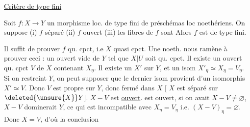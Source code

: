 \uline{Critère de type fini}

 \quad Soit $f:X\longrightarrow Y$ un morphisme loc. de
type fini de préschémas loc noethériens. On
suppose (i) $f$ séparé (ii) $f$  ouvert (iii) les
fibres de $f$ sont  Alors $f$
est de type fini.

 Il suffit de prouver $f$ qu. cpct, i.e $X$ quasi cpct.
Une  noeth.   nous
ramène à prouver ceci : 
un ouvert  vide de $Y$ tel que $X|U$ soit
qu. cpct.  Il existe un ouvert qu. cpct $V$ de $X$  contenant $X_\eta$. Il existe un
$X'$  sur $Y$, et un isom
$X'_\eta\simeq X_\eta=V_\eta$. Si on restreint $Y$, on peut
supposer que le dernier isom provient
d'un isomorphis $X'\simeq V$. Donc 
$V$ est propre sur $Y$, donc fermé dans $X$ [ $X$ est
séparé sur $\deleted{\unsure{X}}Y$].  
 $X-V$ est \uline{ouvert}. 
 est ouvert, 
si on avait $X-V\ne\varnothing$, $X-V$ dominerait $Y$,
 ce qui est incompatible avec $X_\eta=V_\eta$
i.e. $(X-V)_\eta=\varnothing$. Donc $X=V$, d'où la conclusion
